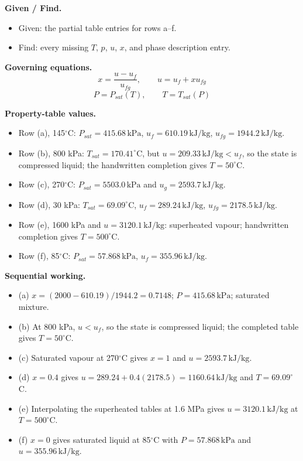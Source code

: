 \textbf{Given / Find.}
\begin{itemize}
  \item Given: the partial table entries for rows a--f.
  \item Find: every missing $T$, $p$, $u$, $x$, and phase description entry.
\end{itemize}

\textbf{Governing equations.}
\[
x=\frac{u-u_f}{u_{fg}},\qquad u=u_f+xu_{fg}
\]
\[
P=P_{sat}(T),\qquad T=T_{sat}(P)
\]

\textbf{Property-table values.}
\begin{itemize}
  \item Row (a), 145$^\circ$C: $P_{sat}=415.68\,\text{kPa}$, $u_f=610.19\,\text{kJ/kg}$, $u_{fg}=1944.2\,\text{kJ/kg}$.
  \item Row (b), 800 kPa: $T_{sat}=170.41^\circ\text{C}$, but $u=209.33\,\text{kJ/kg}<u_f$, so the state is compressed liquid; the handwritten completion gives $T=50^\circ$C.
  \item Row (c), 270$^\circ$C: $P_{sat}=5503.0\,\text{kPa}$ and $u_g=2593.7\,\text{kJ/kg}$.
  \item Row (d), 30 kPa: $T_{sat}=69.09^\circ\text{C}$, $u_f=289.24\,\text{kJ/kg}$, $u_{fg}=2178.5\,\text{kJ/kg}$.
  \item Row (e), 1600 kPa and $u=3120.1\,\text{kJ/kg}$: superheated vapour; handwritten completion gives $T=500^\circ$C.
  \item Row (f), 85$^\circ$C: $P_{sat}=57.868\,\text{kPa}$, $u_f=355.96\,\text{kJ/kg}$.
\end{itemize}

\textbf{Sequential working.}
\begin{itemize}
  \item (a) $x=(2000-610.19)/1944.2=0.7148$; $P=415.68\,\text{kPa}$; saturated mixture.
  \item (b) At 800 kPa, $u< u_f$, so the state is compressed liquid; the completed table gives $T=50^\circ$C.
  \item (c) Saturated vapour at 270$^\circ$C gives $x=1$ and $u=2593.7\,\text{kJ/kg}$.
  \item (d) $x=0.4$ gives $u=289.24+0.4(2178.5)=1160.64\,\text{kJ/kg}$ and $T=69.09^\circ$C.
  \item (e) Interpolating the superheated tables at 1.6 MPa gives $u=3120.1\,\text{kJ/kg}$ at $T=500^\circ$C.
  \item (f) $x=0$ gives saturated liquid at 85$^\circ$C with $P=57.868\,\text{kPa}$ and $u=355.96\,\text{kJ/kg}$.
\end{itemize}


